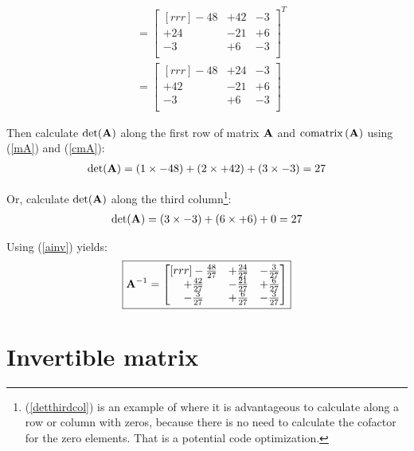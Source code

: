 \documentclass{article}%
\begin{document}
\begin{multicols}{2}
\begin{align}
 &= \begin{bmatrix}[rrr]
-48& +42& -3\\ +24& -21& +6\\ -3& +6& -3\\
\end{bmatrix}^T \label{cmA} \\
 &= \begin{bmatrix}[rrr]
-48& +24& -3\\ +42& -21& +6\\ -3& +6& -3\\
\end{bmatrix}
\end{align}

Then calculate $\det(\mathbf{A})$ along the first row of matrix $\mathbf{A}$ and $\operatorname{comatrix}{(\mathbf{A})}$ using (\ref{mA}) and (\ref{cmA}):
\begin{align}
\det(\mathbf{A}) = (1 \times -48) + (2 \times +42) + (3 \times -3) = 27
\end{align}

Or, calculate $\det(\mathbf{A})$ along the third column\footnote{(\ref{detthirdcol}) is an example of where it is advantageous to calculate along a row or column with zeros, because there is no need to calculate the cofactor for the zero elements. That is a potential code optimization.}:
\begin{align}
\det(\mathbf{A}) = (3 \times -3) + (6 \times +6) + 0 = 27 \label{detthirdcol}
\end{align}

Using (\ref{ainv}) yields:
\begin{gather}
\boxed{\mathbf{A}^{-1} = \begin{bmatrix}[rrr]
-\frac{48}{27}& +\frac{24}{27}& -\frac{3}{27}\\ +\frac{42}{27}& -\frac{21}{27}& +\frac{6}{27}\\ -\frac{3}{27}& +\frac{6}{27}& -\frac{3}{27}\\
\end{bmatrix}}
\end{gather}

\section{Invertible matrix}
\label{Invertiblematrix}


\end{multicols}
\end{document}
